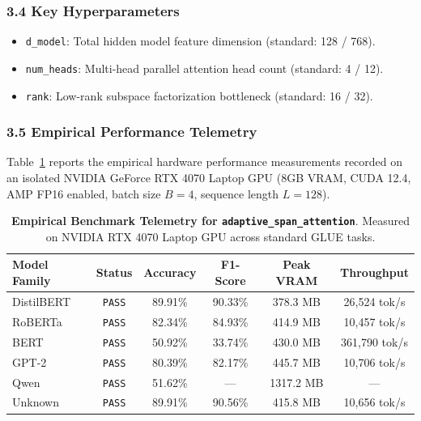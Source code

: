 \subsubsection*{3.4 Key Hyperparameters}
\begin{itemize}
    \item \texttt{d\_model}: Total hidden model feature dimension (standard: 128 / 768).
    \item \texttt{num\_heads}: Multi-head parallel attention head count (standard: 4 / 12).
    \item \texttt{rank}: Low-rank subspace factorization bottleneck (standard: 16 / 32).
\end{itemize}

\subsubsection*{3.5 Empirical Performance Telemetry}
Table~\ref{tab:telemetry_adaptive_span_attention} reports the empirical hardware performance measurements recorded on an isolated NVIDIA GeForce RTX 4070 Laptop GPU (8GB VRAM, CUDA 12.4, AMP FP16 enabled, batch size $B=4$, sequence length $L=128$).

\begin{table}[h]
\centering
\small
\caption{\textbf{Empirical Benchmark Telemetry for \texttt{adaptive\_span\_attention}}. Measured on NVIDIA RTX 4070 Laptop GPU across standard GLUE tasks.}
\label{tab:telemetry_adaptive_span_attention}
\begin{tabular*}{\columnwidth}{@{\extracolsep{\fill}}lccccc}
\toprule
\textbf{Model Family} & \textbf{Status} & \textbf{Accuracy} & \textbf{F1-Score} & \textbf{Peak VRAM} & \textbf{Throughput} \\
\midrule
DistilBERT & \texttt{PASS} & 89.91\% & 90.33\% & 378.3 MB & 26,524 tok/s \\
RoBERTa & \texttt{PASS} & 82.34\% & 84.93\% & 414.9 MB & 10,457 tok/s \\
BERT & \texttt{PASS} & 50.92\% & 33.74\% & 430.0 MB & 361,790 tok/s \\
GPT-2 & \texttt{PASS} & 80.39\% & 82.17\% & 445.7 MB & 10,706 tok/s \\
Qwen & \texttt{PASS} & 51.62\% & --- & 1317.2 MB & --- \\
Unknown & \texttt{PASS} & 89.91\% & 90.56\% & 415.8 MB & 10,656 tok/s \\
\bottomrule
\end{tabular*}
\end{table}

